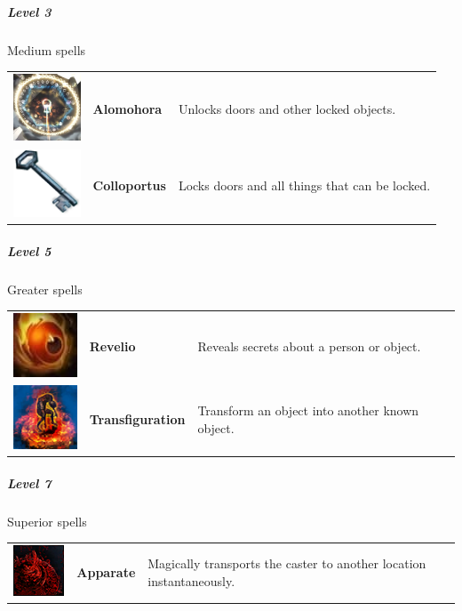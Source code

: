 \subparagraph{Level 3} 
Medium  spells\\
\begin{tabular}{ m{2cm}m{3cm}m{8cm} } 
	\includegraphics[width=2cm]{../Pictures/Gameplay/Spells/Icon/Alomohora_spell_icon.png} & \textbf{Alomohora} & Unlocks doors and other locked objects. \\ 
   \includegraphics[width=2cm]{../Pictures/Gameplay/Spells/Icon/Colloportus_spell_icon.png} & \textbf{Colloportus} &  Locks doors and all things that can be locked. \\ 
\end{tabular}
	

\subparagraph{Level 5} 
Greater spells\\
\begin{tabular}{ m{2cm}m{3cm}m{8cm} } 
	\includegraphics[width=2cm]{../Pictures/Gameplay/Spells/Icon/Revelio_spell_icon.jpg} & \textbf{Revelio} & Reveals secrets about a person or object.  \\ 
	\includegraphics[width=2cm]{../Pictures/Gameplay/Spells/Icon/Transfiguration_spell_icon.png} & \textbf{Transfiguration} &Transform an object into another known object.\\ 
\end{tabular}


\subparagraph{Level 7} 
Superior  spells\\
\begin{tabular}{ m{2cm}m{3cm}m{8cm} } 
	\includegraphics[width=2cm]{../Pictures/Gameplay/Spells/Icon/Apparate_spell_icon.png} & \textbf{Apparate} & Magically transports the caster to another location instantaneously.  \\ 
\end{tabular}

